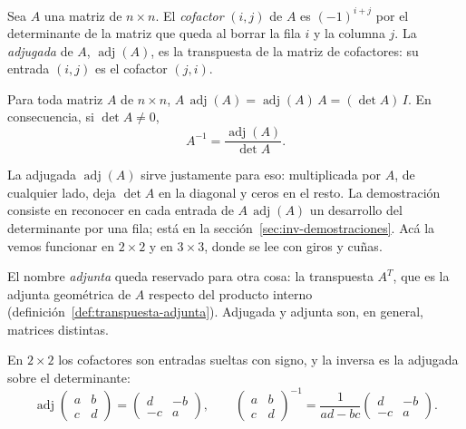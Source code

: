 \begin{definicion}[Adjugada]\label{def:adjugada}
Sea \(A\) una matriz de \(n\times n\). El \emph{cofactor} \((i,j)\) de \(A\) es \((-1)^{i+j}\)
por el determinante de la matriz que queda al borrar la fila \(i\) y la columna \(j\). La
\emph{adjugada} de \(A\), \(\operatorname{adj}(A)\), es la transpuesta de la matriz de
cofactores: su entrada \((i,j)\) es el cofactor \((j,i)\).
\end{definicion}

\begin{proposicion}\label{prop:adjugada-inversa}
Para toda matriz \(A\) de \(n\times n\),
\(A\,\operatorname{adj}(A)=\operatorname{adj}(A)\,A=(\det A)\,I\). En consecuencia, si
\(\det A\neq0\),
\[
  A^{-1}=\frac{\operatorname{adj}(A)}{\det A}.
\]
\end{proposicion}

La adjugada \(\operatorname{adj}(A)\) sirve justamente para eso: multiplicada por \(A\), de
cualquier lado, deja \(\det A\) en la diagonal y ceros en el resto. La demostración
consiste en reconocer en cada entrada de \(A\,\operatorname{adj}(A)\) un desarrollo del
determinante por una fila; está en la sección~\ref{sec:inv-demostraciones}. Acá la vemos
funcionar en \(2\times2\) y en \(3\times3\), donde se lee con giros y cuñas.

El nombre \emph{adjunta} queda reservado para otra cosa: la transpuesta \(A^T\), que es la
adjunta geométrica de \(A\) respecto del producto interno
(definición~\ref{def:transpuesta-adjunta}). Adjugada y adjunta son, en general, matrices
distintas.

En \(2\times2\) los cofactores son entradas sueltas con signo, y la inversa es la adjugada
sobre el determinante:
\[
  \operatorname{adj}\begin{pmatrix}a&b\\c&d\end{pmatrix}=\begin{pmatrix}d&-b\\-c&a\end{pmatrix},
  \qquad
  \begin{pmatrix}a&b\\c&d\end{pmatrix}^{-1}=\frac1{ad-bc}\begin{pmatrix}d&-b\\-c&a\end{pmatrix}.
\]

